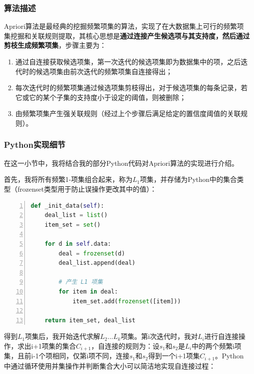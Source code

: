 \documentclass[12pt,a4paper]{article}
\theoremstyle{definition}
\begin{document}
\subsubsection{算法描述}
\vspace{0.006\linewidth}
Apriori算法是最经典的挖掘频繁项集的算法，实现了在大数据集上可行的频繁项集挖掘和关联规则提取，其核心思想是\textbf{通过连接产生候选项与其支持度，然后通过剪枝生成频繁项集}，步骤主要为：

\begin{enumerate}

\item 通过自连接获取候选项集，第一次迭代的候选项集即为数据集中的项，之后迭代时的候选项集由前次迭代的频繁项集自连接得出；

\item 每次迭代时的频繁项集通过候选项集剪枝得出，对于候选项集的每条记录，若它或它的某个子集的支持度小于设定的阈值，则被删除；

\item 由频繁项集产生强关联规则（经过上个步骤后满足给定的置信度阈值的关联规则）。

\end{enumerate}

\subsubsection{Python实现细节}

在这一小节中，我将结合我的部分Python代码对Apriori算法的实现进行介绍。

\vspace{0.01\linewidth}
首先，我将所有频繁1-项集组合起来，称为$L_1$项集，并存储为Python中的集合类型（frozenset类型用于防止误操作更改其中的值）：

\begin{lstlisting}[language=Python,
	numbers=left,
	keywordstyle=\color{blue!70},
	frame=shadowbox,
	breaklines=True]
def _init_data(self):
    deal_list = list()
    item_set = set()

    for d in self.data:
        deal = frozenset(d)
        deal_list.append(deal)

        # 产生 L1 项集
        for item in deal:
            item_set.add(frozenset([item]))

    return item_set, deal_list
\end{lstlisting}

\vspace{0.02\linewidth}
得到$L_1$项集后，我开始迭代求解$L_2...L_k$项集。第i次迭代时，我对$L_i$进行自连接操作，求出i+1项集的集合$C_{i+1}$，自连接的规则为：设$s_1$和$s_2$是$L_i$中的两个频繁i项集，且前i-1个项相同，仅第i项不同，连接$s_1$和$s_2$得到一个i+1项集$C_{i+1}$。Python中通过循环使用并集操作并判断集合大小可以简洁地实现自连接过程：
\end{document}
